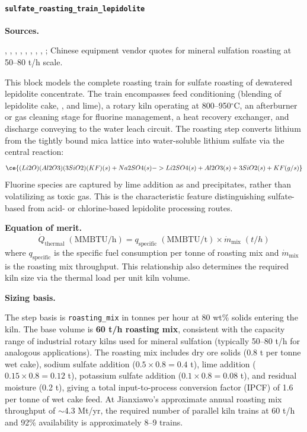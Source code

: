 \clearpage
\paragraph{\texttt{sulfate\_roasting\_train\_lepidolite}}\label{app:04-methods-blockdefs-sulfateroasting}

\medskip
\noindent\textbf{Sources.}\quad

\citet{dengSystematicReviewSulfate2026}, \citet{yanExtractionLithiumLepidolite2012}, \citet{gaoLithiumExtractionHard2023}, \citet{parkEffectiveLithiumExtraction2023}, \citet{nanMethodsExtractingLithium2019}, \citet{nanMethodsExtractingLithium2022}, \citet{zouMethodEfficientLithium2024}, \citet{jiaoKeyTechnologiesDevelopment2024}, \citet{garrettHandbookLithiumNatural2004}; Chinese equipment vendor quotes for mineral sulfation roasting at 50--80 t/h scale.

This block models the complete roasting train for sulfate roasting of dewatered lepidolite concentrate. The train encompasses feed conditioning (blending of lepidolite cake, , and lime), a rotary kiln operating at 800--950$^\circ$C, an afterburner or gas cleaning stage for fluorine management, a heat recovery exchanger, and discharge conveying to the water leach circuit. The roasting step converts lithium from the tightly bound mica lattice into water-soluble lithium sulfate via the central reaction:
\begin{equation}
    \ce{(Li2O)(Al2O3)(3SiO2)(KF)(s) + Na2SO4(s) ->
    Li2SO4(s) + Al2O3(s) + 3SiO2(s) + KF(g/s)}
\end{equation}
Fluorine species are captured by lime addition as  and  precipitates, rather than volatilizing as toxic  gas. This is the characteristic feature distinguishing sulfate-based from acid- or chlorine-based lepidolite processing routes.

\medskip
\noindent\textbf{Equation of merit.}\quad
\[
    \dot{Q}_\text{thermal}\;(\text{MMBTU/h}) = q_\text{specific}\;(\text{MMBTU/t}) \times \dot{m}_\text{mix}\;(\si{t/h})
\]
where $q_\text{specific}$ is the specific fuel consumption per tonne of roasting mix and $\dot{m}_\text{mix}$ is the roasting mix throughput. This relationship also determines the required kiln size via the thermal load per unit kiln volume.

\medskip
\noindent\textbf{Sizing basis.}\quad

The step basis is \texttt{roasting\_mix} in tonnes per hour at 80 wt\% solids entering the kiln. The base volume is \textbf{60 t/h roasting mix}, consistent with the capacity range of industrial rotary kilns used for mineral sulfation (typically 50--80 t/h for analogous applications). The roasting mix includes dry ore solids (0.8 t per tonne wet cake), sodium sulfate addition ($0.5 \times 0.8 = 0.4$ t), lime addition ($0.15 \times 0.8 = 0.12$ t), potassium sulfate addition ($0.1 \times 0.8 = 0.08$ t), and residual moisture (0.2 t), giving a total input-to-process conversion factor (IPCF) of 1.6 per tonne of wet cake feed. At Jianxiawo's approximate annual roasting mix throughput of $\sim$4.3 Mt/yr, the required number of parallel kiln trains at 60 t/h and 92\% availability is approximately 8--9 trains.

